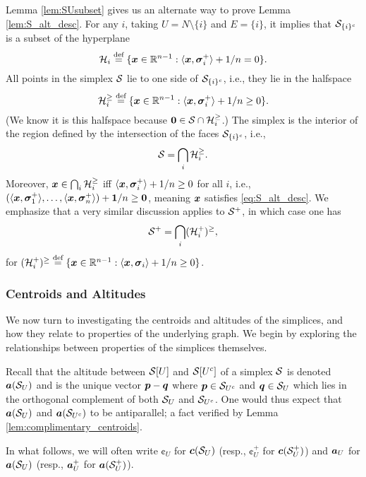 Lemma \ref{lem:SUsubset} gives us an alternate way to prove Lemma \ref{lem:S_alt_desc}. For any $i$,  taking $U=N\setminus \{i\}$ and $E=\{i\}$, it implies that $\mathcal{S}_{\{i\}^c}$ is a subset of the hyperplane 
\[ \mathcal{H}_i\overset{\text{def}}{=} \{\vb*{x}\in\mathbb{R}^{n-1}:\langle \vb*{x},\vb*{\sigma}_i^+\rangle+1/n=0\}.\]
All points in the simplex $\mathcal{S}$ lie to one side of $\mathcal{S}_{\{i\}^c}$, i.e., they lie in the halfspace 
\[\mathcal{H}_i^{\geq } \overset{\text{def}}{=} \{\vb*{x}\in\mathbb{R}^{n-1}:\langle \vb*{x},\vb*{\sigma}_i^+\rangle+1/n\geq0\}.\]
(We know it is this halfspace because $\vb{0}\in\mathcal{S}\cap\mathcal{H}_i^{\geq }$.) The simplex is the interior of the region defined by the intersection of the faces $\mathcal{S}_{\{i\}^c}$, i.e.,   
\begin{equation}
\label{eq:splx_bigcapH_i}
    \mathcal{S}=\bigcap_i \mathcal{H}_i^{\geq }.
\end{equation}
Moreover, $\vb*{x}\in \bigcap_i\mathcal{H}_i^{\geq }$ iff $\langle \vb*{x},\vb*{\sigma}_i^+\rangle +1/n\geq 0$ for all $i$, i.e., $(\langle \vb*{x},\vb*{\sigma}_1^+\rangle,\dots,\langle \vb*{x},\vb*{\sigma}_n^+\rangle) + \vb{1}/n\geq \vb{0}$, meaning $\vb*{x}$ satisfies \eqref{eq:S_alt_desc}.  We emphasize that a very similar discussion applies to $\mathcal{S}^+$, in which case one has 
\begin{equation}
\label{eq:splx^+_bigcapH_i}
\mathcal{S}^+=\bigcap_i (\mathcal{H}_i^+)^{\geq },
\end{equation}
for $(\mathcal{H}_i^+)^{\geq } \overset{\text{def}}{=} \{\vb*{x}\in\mathbb{R}^{n-1}:\langle \vb*{x},\vb*{\sigma}_i\rangle + 1/n\geq 0\}$. 


\subsubsection{Centroids and Altitudes} 
We now turn to investigating the centroids and altitudes of the simplices, and how they relate to properties of the underlying graph. We begin by exploring the relationships between properties of the simplices themselves. 

Recall that the altitude between $\mathcal{S}[U]$ and $\mathcal{S}[U^c]$ of a simplex $\mathcal{S}$ is denoted $\vb*{a}(\mathcal{S}_U)$ and is the unique vector $\vb*{p}-\vb*{q}$ where  $\vb*{p}\in \mathcal{S}_{U^c}$ and $\vb*{q}\in\mathcal{S}_{U}$ which lies in the orthogonal complement of both $\mathcal{S}_U$ and $\mathcal{S}_{U^c}$. One would thus expect that $\vb*{a}(\mathcal{S}_U)$ and $\vb*{a}(\mathcal{S}_{U^c})$ to be antiparallel; a fact verified by Lemma \ref{lem:complimentary_centroids}.  

In what follows,  we will often write $\cent_U$ for $\vb*{c}(\mathcal{S}_U)$ (resp., $\cent_U^+$ for $\vb*{c}(\mathcal{S}_U^+)$) and $\vb*{a}_U$ for $\vb*{a}(\mathcal{S}_U)$ (resp., $\vb*{a}_U^+$ for $\vb*{a}(\mathcal{S}_U^+)$). 

